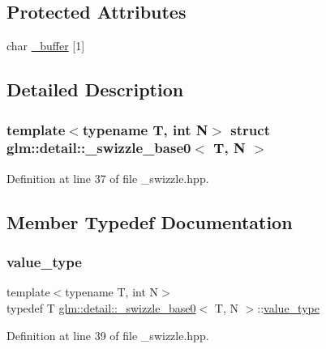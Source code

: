 \subsection*{Protected Attributes}
\begin{DoxyCompactItemize}
\item 
char \hyperlink{structglm_1_1detail_1_1__swizzle__base0_afd4b7f15c9acff4cdef808f559ffec2d}{\+\_\+buffer} \mbox{[}1\mbox{]}
\end{DoxyCompactItemize}


\subsection{Detailed Description}
\subsubsection*{template$<$typename T, int N$>$\newline
struct glm\+::detail\+::\+\_\+swizzle\+\_\+base0$<$ T, N $>$}



Definition at line 37 of file \+\_\+swizzle.\+hpp.



\subsection{Member Typedef Documentation}
\mbox{\label{structglm_1_1detail_1_1__swizzle__base0_ad38a739e1fe6d2db2674f34c98159c8f}} 
\subsubsection{\texorpdfstring{value\+\_\+type}{value\_type}}
{\footnotesize\ttfamily template$<$typename T, int N$>$ \\
typedef T \hyperlink{structglm_1_1detail_1_1__swizzle__base0}{glm\+::detail\+::\+\_\+swizzle\+\_\+base0}$<$ T, N $>$\+::\hyperlink{structglm_1_1detail_1_1__swizzle__base0_ad38a739e1fe6d2db2674f34c98159c8f}{value\+\_\+type}}



Definition at line 39 of file \+\_\+swizzle.\+hpp.



